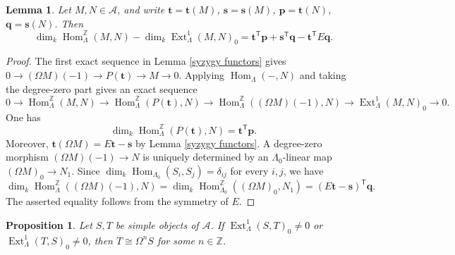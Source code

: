 \documentclass{amsart}
\newtheorem{lem}[thm]{Lemma}
\newtheorem{prop}[thm]{Proposition}
\theoremstyle{definition}
\theoremstyle{remark}
\numberwithin{equation}{thm}
\def\A{\mathcal{A}}
\def\dim{\operatorname{dim}}
\def\Ext{\operatorname{Ext}}
\def\gHom{\operatorname{Hom}^{\mathbb{Z}}}
\def\Hom{\operatorname{Hom}}
\def\L{\Lambda}
\def\T{\mathsf{T}}
\def\Z{\mathbb{Z}}
\def\bfs{\mathbf{s}}
\def\bft{\mathbf{t}}
\def\bfp{\mathbf{p}}
\def\bfq{\mathbf{q}}
\begin{document}
\begin{lem}\label{Ext calculation}
Let $M,N\in\A$, and write $\bft=\bft(M)$, $\bfs=\bfs(M)$, $\bfp=\bft(N)$, $\bfq=\bfs(N)$.
Then
$$
\dim_k\gHom_\L(M,N)-\dim_k\Ext_\L^1(M,N)_0=\bft^{\T}\bfp+\bfs^{\T}\bfq-\bft^{\T}E\bfq.
$$
\end{lem}

\begin{proof}
The first exact sequence in Lemma \ref{syzygy functors} gives $0\to (\Omega M)(-1)\to P(\bft)\to M\to0$. 
Applying $\Hom_\L(-,N)$ and taking the degree-zero part gives an exact sequence
$$
0\to\gHom_\L(M,N)\to\gHom_\L(P(\bft),N)
\to\gHom_\L((\Omega M)(-1),N)\to\Ext_\L^1(M,N)_0\to0.
$$
One has 
$$
\dim_k\gHom_\L(P(\bft),N)=\bft^{\T}\bfp.
$$
Moreover, $\bft(\Omega M)=E\bft-\bfs$ by Lemma \ref{syzygy functors}.  A degree-zero morphism $(\Omega M)(-1)\to N$ is uniquely determined by an $\L_0$-linear map $(\Omega M)_0\to N_1$. Since $\dim_k \Hom_{\L_0}(S_i, S_j)=\delta_{ij}$ for every $i,j$, we have
$$
\dim_k\gHom_\L((\Omega M)(-1),N)=\dim_k\gHom_{\L_0}((\Omega M)_0,N_1)=(E\bft-\bfs)^{\T}\bfq.
$$
The asserted equality follows from the symmetry of $E$.
\end{proof}

\begin{prop}\label{simple orthogonal}
Let $S,T$ be simple objects of $\A$.  If $\Ext_\L^1(S,T)_0\ne0$ or $\Ext_\L^1(T,S)_0\ne0$, then $T\cong \Omega^nS$ for some $n\in\Z$.
\end{prop}
\end{document}
